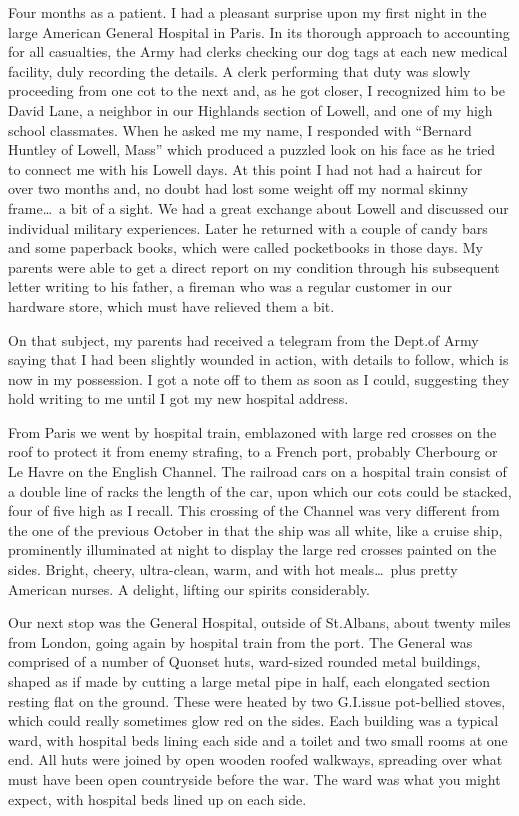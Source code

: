 \documentclass[../m3y]{subfiles}
\begin{document}
Four months as a patient. I had a pleasant surprise upon my first night in the large American General Hospital in Paris. In its thorough approach to accounting for all casualties, the Army had clerks checking our dog tags at each new medical facility, duly recording the details. A clerk performing that duty was slowly proceeding from one cot to the next and, as he got closer, I recognized him to be David Lane, a neighbor in our Highlands section of Lowell, and one of my high school classmates. When he asked me my name, I responded with ``Bernard Huntley of Lowell, Mass'' which produced a puzzled look on his face as he tried to connect me with his Lowell days. At this point I had not had a haircut for over two months and, no doubt had lost some weight off my normal skinny frame\ldots\ a bit of a sight. We had a great exchange about Lowell and discussed our individual military experiences. Later he returned with a couple of candy bars and some paperback books, which were called pocketbooks in those days. My parents were able to get a direct report on my condition through his subsequent letter writing to his father, a fireman who was a regular customer in our hardware store, which must have relieved them a bit.

On that subject, my parents had received a telegram from the Dept.\@ of Army saying that I had been slightly wounded in action, with details to follow, which is now in my possession. I got a note off to them as soon as I could, suggesting they hold writing to me until I got my new hospital address.

From Paris we went by hospital train, emblazoned with large red crosses on the roof to protect it from enemy strafing, to a French port, probably Cherbourg or Le Havre on the English Channel. The railroad cars on a hospital train consist of a double line of racks the length of the car, upon which our cots could be stacked, four of five high as I recall. This crossing of the Channel was very different from the one of the previous October in that the ship was all white, like a cruise ship, prominently illuminated at night to display the large red crosses painted on the sides. Bright, cheery, ultra-clean, warm, and with hot meals\ldots\ plus pretty American nurses. A delight, lifting our spirits considerably.

Our next stop was the  General Hospital, outside of St.\@ Albans, about twenty miles from London, going again by hospital train from the port. The  General was comprised of a number of Quonset huts, ward-sized rounded metal buildings, shaped as if made by cutting a large metal pipe in half, each elongated section resting flat on the ground. These were heated by two G.I.\@ issue pot-bellied stoves, which could really sometimes glow red on the sides. Each building was a typical ward, with hospital beds lining each side and a toilet and two small rooms at one end. All huts were joined by open wooden roofed walkways, spreading over what must have been open countryside before the war. The ward was what you might expect, with hospital beds lined up on each side.
\end{document}
